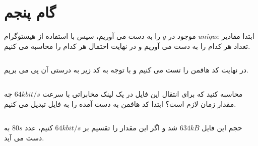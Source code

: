 \def \Subject {گام پنجم}


\section{\Subject}

ابتدا مقادیر 
\(unique\)
موجود در 
\(y\)
را به دست می آوریم، سپس با استفاده از هیستوگرام تعداد هر کدام را به دست می آوریم و در نهایت احتمال هر کدام را محاسبه می کنیم.

\begin{latin}
    \inputminted[frame=none]{csharp}{s_5_1.cs}
\end{latin}



در نهایت کد هافمن را تست می کنیم و با توجه به کد زیر به درستی آن پی می بریم.
\begin{latin}
    \inputminted[frame=none]{csharp}{s_5_2.cs}
\end{latin}

محاسبه کنید که برای انتقال این فایل در یک لینک مخابراتی با سرعت 
\(64 kbit/s\)
چه مقدار زمان لازم است؟
ابتدا کد هافمن به دست آمده را به فایل تبدیل می کنیم.
\begin{latin}
    \inputminted[frame=none]{csharp}{s_5_3.cs}
\end{latin}

حجم این فایل 
\(634 kB\)
شد و اگر این مقدار را تقسیم بر 
\(64 kbit/s\)
کنیم، عدد 
\(80 s\)
به دست می آید.
